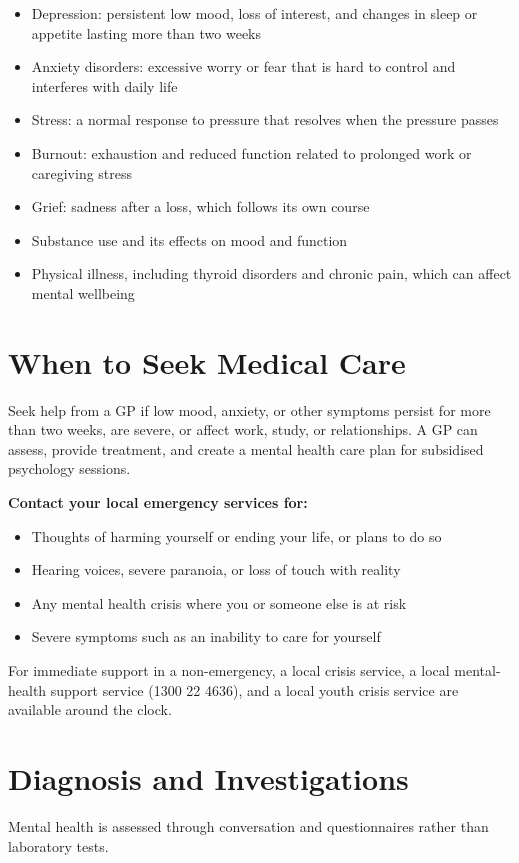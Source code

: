 \begin{itemize}
    \item Depression: persistent low mood, loss of interest, and changes in sleep or appetite lasting more than two weeks
    \item Anxiety disorders: excessive worry or fear that is hard to control and interferes with daily life
    \item Stress: a normal response to pressure that resolves when the pressure passes
    \item Burnout: exhaustion and reduced function related to prolonged work or caregiving stress
    \item Grief: sadness after a loss, which follows its own course
    \item Substance use and its effects on mood and function
    \item Physical illness, including thyroid disorders and chronic pain, which can affect mental wellbeing
\end{itemize}

\section*{When to Seek Medical Care}
Seek help from a GP if low mood, anxiety, or other symptoms persist for more than two weeks, are severe, or affect work, study, or relationships. A GP can assess, provide treatment, and create a mental health care plan for subsidised psychology sessions.

\textbf{Contact your local emergency services for:}
\begin{itemize}
    \item Thoughts of harming yourself or ending your life, or plans to do so
    \item Hearing voices, severe paranoia, or loss of touch with reality
    \item Any mental health crisis where you or someone else is at risk
    \item Severe symptoms such as an inability to care for yourself
\end{itemize}
For immediate support in a non-emergency, a local crisis service, a local mental-health support service (1300 22 4636), and a local youth crisis service are available around the clock.

\section*{Diagnosis and Investigations}
Mental health is assessed through conversation and questionnaires rather than laboratory tests.

